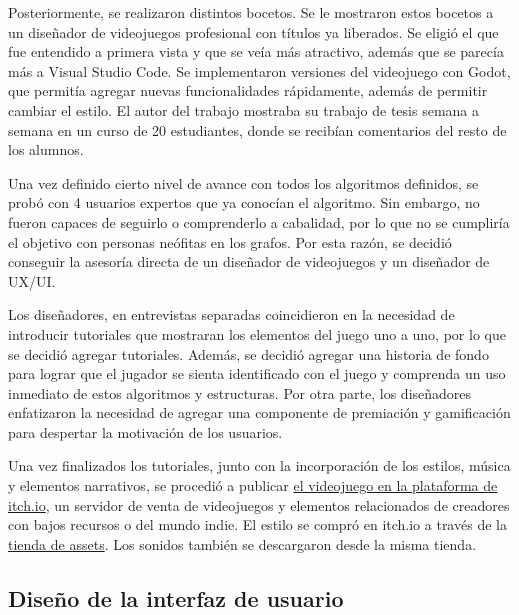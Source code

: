 
Posteriormente, se realizaron distintos bocetos. Se le mostraron estos bocetos a un diseñador de videojuegos profesional con títulos ya liberados. Se eligió el que fue entendido a primera vista y que se veía más atractivo, además que se parecía más a Visual Studio Code. Se implementaron versiones del videojuego con Godot, que permitía agregar nuevas funcionalidades rápidamente, además de permitir cambiar el estilo. El autor del trabajo mostraba su trabajo de tesis semana a semana en un curso de 20 estudiantes, donde se recibían comentarios del resto de los alumnos.

Una vez definido cierto nivel de avance con todos los algoritmos definidos, se probó con 4 usuarios expertos que ya conocían el algoritmo. Sin embargo, no fueron capaces de seguirlo o comprenderlo a cabalidad, por lo que no se cumpliría el objetivo con personas neófitas en los grafos. Por esta razón, se decidió conseguir la asesoría directa de un diseñador de videojuegos y un diseñador de UX/UI.

Los diseñadores, en entrevistas separadas coincidieron en la necesidad de introducir tutoriales que mostraran los elementos del juego uno a uno, por lo que se decidió agregar tutoriales. Además, se decidió agregar una historia de fondo para lograr que el jugador se sienta identificado con el juego y comprenda un uso inmediato de estos algoritmos y estructuras. Por otra parte, los diseñadores enfatizaron la necesidad de agregar una componente de premiación y gamificación para despertar la motivación de los usuarios.

Una vez finalizados los tutoriales, junto con la incorporación de los estilos, música y elementos narrativos, se procedió a publicar \href{https://alasaltum.itch.io/igasce}{el videojuego en la plataforma de itch.io}, un servidor de venta de videojuegos y elementos relacionados de creadores con bajos recursos o del mundo indie. El estilo se compró en itch.io a través de la \href{https://azagaya.itch.io/sci-fi-theme}{tienda de assets}. Los sonidos también se descargaron desde la misma tienda.


\subsection{Diseño de la interfaz de usuario}

